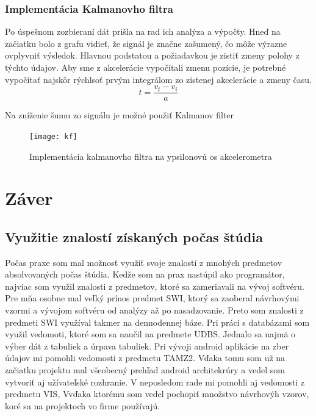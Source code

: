 \documentclass[11pt, oneside]{report}
\begin{document}
\subsection{Implementácia Kalmanovho filtra}
Po úspešnom zozbieraní dát prišla na rad ich analýza a výpočty. Hneď na začiatku bolo z grafu vidieť, že signál je značne zašumený, čo môže  výrazne ovplyvniť  výsledok. Hlavnou podstatou a požiadavkou je zistiť zmeny polohy z týchto údajov. Aby sme z akcelerácie vypočítali  zmenu pozície, je potrebné vypočítať najskôr rýchlsoť prvým integrálom zo zistenej akcelerácie a zmeny času.
\[t=  \frac{v_t - v_i}{a} \]

Na zníženie šumu zo signálu je možné použiť Kalmanov filter\cite{bishop2001introduction}

\begin{figure}[h]
    \centering
    \texttt{[image: kf]}
    \caption{Implementácia kalmanovho filtra na ypsilonovú os akcelerometra}
    \label{fig:propertycompare}
\end{figure}
\newpage	
\chapter{Záver}
\section{Využitie znalostí získaných počas štúdia}
Počas praxe som mal možnosť využiť svoje znalostí z mnohých  predmetov absolvovaných počas štúdia. Kedže som na prax nastúpil ako programátor, najviac som využil znalosti z predmetov, ktoré sa zameriavali na vývoj softvéru. Pre mňa osobne mal veľký prínos predmet SWI, ktorý sa zaoberal návrhovými vzormi a vývojom softvéru od analýzy až po nasadzovanie. Preto som znalosti z predmeti SWI využíval takmer na dennodennej báze. Pri práci s databázami som využil vedomoti, ktoré som sa naučil na predmete UDBS. Jednalo sa najmä o  výber dát z tabuliek a  úrpava tabuliek. Pri vývoji android aplikácie na zber údajov mi pomohli vedomosti z predmetu TAMZ2. Vďaka tomu som už  na začiatku projektu mal všeobecný prehľad android architekrúry a vedel som vytvoriť aj  užívateľské rozhranie. V neposledom rade mi pomohli aj  vedomosti z predmetu VIS, Vvďaka ktorému som vedel pochopiť množstvo návrhovýh  vzorov, koré sa na projektoch vo firme používajú.
\end{document}
